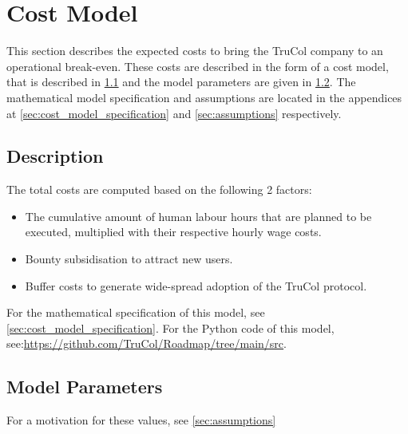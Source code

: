 \section{Cost Model}\label{sec:cost_model}
This section describes the expected costs to bring the TruCol company to an operational break-even. These costs are described in the form of a cost model, that is described in \cref{subsec:model_description} and the model parameters are given in \cref{subsec:model_parameters}. The mathematical model specification and assumptions are located in the appendices at \cref{sec:cost_model_specification} and \cref{sec:assumptions} respectively.

\subsection{Description}\label{subsec:model_description}
The total costs are computed based on the following 2 factors:
\begin{itemize}
	\item The cumulative amount of human labour hours that are planned to be executed, multiplied with their respective hourly wage costs.
	\item Bounty subsidisation to attract new users.
	\item Buffer costs to generate wide-spread adoption of the TruCol protocol.
\end{itemize}
For the mathematical specification of this model, see \cref{sec:cost_model_specification}. For the Python code of this model, see:\url{https://github.com/TruCol/Roadmap/tree/main/src}.

\subsection{Model Parameters}\label{subsec:model_parameters}

\ifx\homepath\overleafhome
\else
\fi
For a motivation for these values, see \cref{sec:assumptions}
